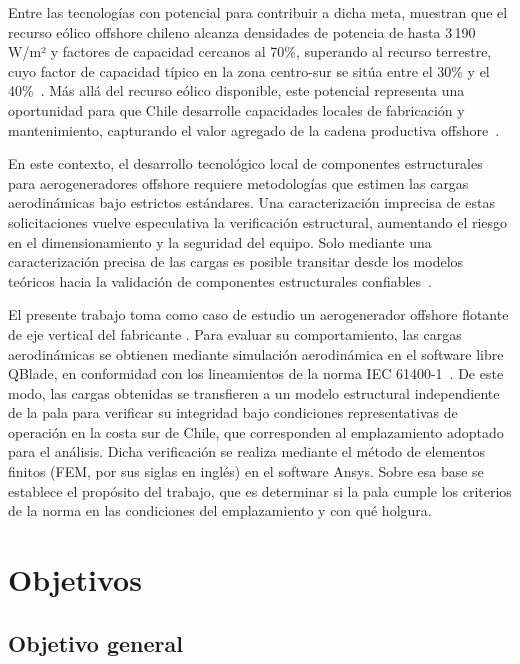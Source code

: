 Entre las tecnologías con potencial para contribuir a dicha meta, \textcite{Mattar2021} muestran que el recurso eólico offshore chileno alcanza densidades de potencia de hasta 3\,190 W/m² y factores de capacidad cercanos al 70\%, superando al recurso terrestre, cuyo factor de capacidad típico en la zona centro-sur se sitúa entre el 30\% y el 40\%~\parencite{Tampier2024}. Más allá del recurso eólico disponible, este potencial representa una oportunidad para que Chile desarrolle capacidades locales de fabricación y mantenimiento, capturando el valor agregado de la cadena productiva offshore~\parencite{Tampier2024}.

En este contexto, el desarrollo tecnológico local de componentes estructurales para aerogeneradores offshore requiere metodologías que estimen las cargas aerodinámicas bajo estrictos estándares. Una caracterización imprecisa de estas solicitaciones vuelve especulativa la verificación estructural, aumentando el riesgo en el dimensionamiento y la seguridad del equipo. Solo mediante una caracterización precisa de las cargas es posible transitar desde los modelos teóricos hacia la validación de componentes estructurales confiables~\parencite{Tampier2024}.

El presente trabajo toma como caso de estudio un aerogenerador offshore flotante de eje vertical del fabricante \textcite{SeaTwirl2026}. Para evaluar su comportamiento, las cargas aerodinámicas se obtienen mediante simulación aerodinámica en el software libre QBlade, en conformidad con los lineamientos de la norma IEC 61400-1~\parencite*{IEC61400-1}. De este modo, las cargas obtenidas se transfieren a un modelo estructural independiente de la pala para verificar su integridad bajo condiciones representativas de operación en la costa sur de Chile, que corresponden al emplazamiento adoptado para el análisis. Dicha verificación se realiza mediante el método de elementos finitos (FEM, por sus siglas en inglés) en el software Ansys. Sobre esa base se establece el propósito del trabajo, que es determinar si la pala cumple los criterios de la norma en las condiciones del emplazamiento y con qué holgura.

\section{Objetivos}

\subsection{Objetivo general}

